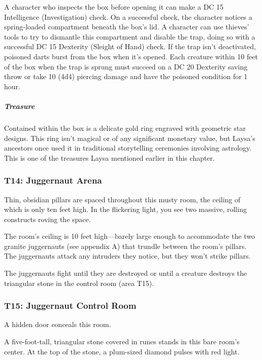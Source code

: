 \documentclass[10pt,a4paper,twoside,bg=print,twocolumn,openany,nodeprecatedcode]{dndbook}
\begin{document}
A character who inspects the box before opening it can make a DC 15 Intelligence (Investigation) check. On a successful check, the character notices a spring-loaded compartment beneath the box's lid. A character can use thieves' tools to try to dismantle this compartment and disable the trap, doing so with a successful DC 15 Dexterity (Sleight of Hand) check. If the trap isn't deactivated, poisoned darts burst from the box when it's opened. Each creature within 10 feet of the box when the trap is sprung must succeed on a DC 20 Dexterity saving throw or take 10 (4d4) piercing damage and have the poisoned condition for 1 hour.

\subparagraph{Treasure}
Contained within the box is a delicate gold ring engraved with geometric star designs. This ring isn't magical or of any significant monetary value, but Laysa's ancestors once used it in traditional storytelling ceremonies involving astrology. This is one of the treasures Laysa mentioned earlier in this chapter.

\subsubsection{T14: Juggernaut Arena}
\begin{DndReadAloud}{}
Thin, obsidian pillars are spaced throughout this musty room, the ceiling of which is only ten feet high. In the flickering light, you see two massive, rolling constructs roving the space.

\end{DndReadAloud}

The room's ceiling is 10 feet high—barely large enough to accommodate the two granite juggernauts (see appendix A) that trundle between the room's pillars. The juggernauts attack any intruders they notice, but they won't strike pillars.

The juggernauts fight until they are destroyed or until a creature destroys the triangular stone in the control room (area T15).

\subsubsection{T15: Juggernaut Control Room}
A hidden door conceals this room.

\begin{DndReadAloud}{}
A five-foot-tall, triangular stone covered in runes stands in this bare room's center. At the top of the stone, a plum-sized diamond pulses with red light.

\end{DndReadAloud}
\end{document}
